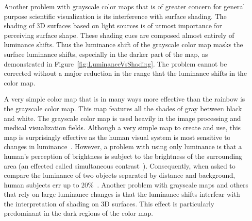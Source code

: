 \documentclass{llncs}
\newcommand{\lcite}[1]{~\cite{#1}}
\begin{document}
{  Another problem with grayscale color maps that is of greater concern for
  general purpose scientific visualization is its interference with surface
  shading.  The shading of 3D surfaces based on light sources is of utmost
  importance for perceiving surface shape.  These shading cues are composed
  almost entirely of luminance shifts.  Thus the luminance shift of the
  grayscale color map masks the surface luminance shifts, especially in the
  darker part of the map, as demonstrated in
  Figure~\ref{fig:LuminanceVsShading}.  The problem cannot be corrected
  without a major reduction in the range that the luminance shifts in the
  color map.

}{

  A very simple color map that is in many ways more effective than the
  rainbow is the grayscale color map.  This map features all the shades of
  gray between black and white.  The grayscale color map is used heavily in
  the image processing and medical visualization fields.  Although a very
  simple map to create and use, this map is surprisingly effective as the
  human visual system is most sensitive to changes in
  luminance\lcite{Mullen85,Ware04}.  However, a problem with using only
  luminance is that a human's perception of brightness is subject to the
  brightness of the surrounding area (an effected called simultaneous
  contrast\lcite{Stone05}).  Consequently, when asked to compare the
  luminance of two objects separated by distance and background, human
  subjects err up to 20\%\lcite{Ware88}.  Another problem with grayscale
  maps and others that rely on large luminance changes is that the
  luminance shifts interfear with the interpretation of shading on 3D
  surfaces.  This effect is particularly predominant in the dark regions of
  the color map.

}
\end{document}
